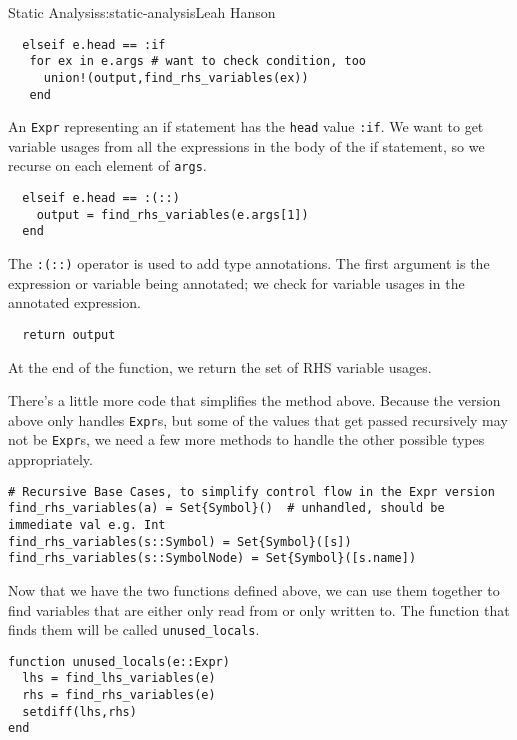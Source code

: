 \begin{aosachapter}{Static Analysis}{s:static-analysis}{Leah Hanson}
\begin{verbatim}
  elseif e.head == :if
   for ex in e.args # want to check condition, too
     union!(output,find_rhs_variables(ex))
   end
\end{verbatim}

An \texttt{Expr} representing an if statement has the \texttt{head}
value \texttt{:if}. We want to get variable usages from all the
expressions in the body of the if statement, so we recurse on each
element of \texttt{args}.

\begin{verbatim}
  elseif e.head == :(::)
    output = find_rhs_variables(e.args[1])
  end
\end{verbatim}

The \texttt{:(::)} operator is used to add type annotations. The first
argument is the expression or variable being annotated; we check for
variable usages in the annotated expression.

\begin{verbatim}
  return output
\end{verbatim}

At the end of the function, we return the set of RHS variable usages.

There's a little more code that simplifies the method above. Because the
version above only handles \texttt{Expr}s, but some of the values that
get passed recursively may not be \texttt{Expr}s, we need a few more
methods to handle the other possible types appropriately.

\begin{verbatim}
# Recursive Base Cases, to simplify control flow in the Expr version
find_rhs_variables(a) = Set{Symbol}()  # unhandled, should be immediate val e.g. Int
find_rhs_variables(s::Symbol) = Set{Symbol}([s])
find_rhs_variables(s::SymbolNode) = Set{Symbol}([s.name])
\end{verbatim}

\label{putting-it-together}

Now that we have the two functions defined above, we can use them
together to find variables that are either only read from or only
written to. The function that finds them will be called
\texttt{unused\_locals}.

\begin{verbatim}
function unused_locals(e::Expr)
  lhs = find_lhs_variables(e)
  rhs = find_rhs_variables(e)
  setdiff(lhs,rhs)
end
\end{verbatim}


\end{aosachapter}
